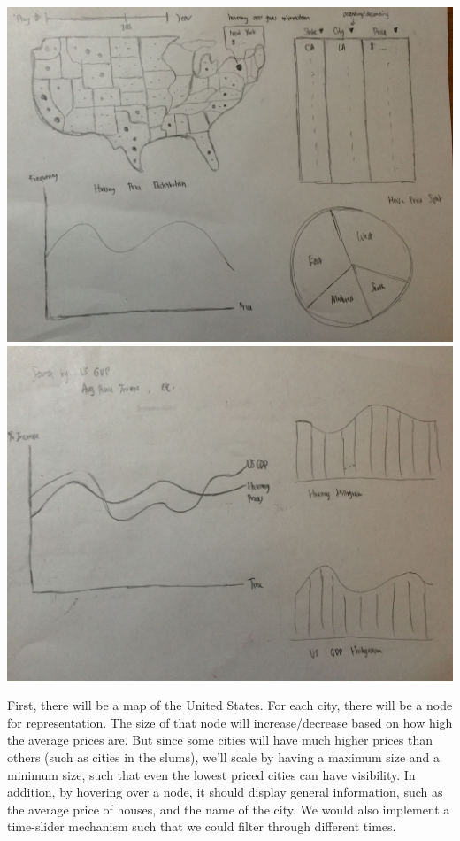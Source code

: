 \documentclass[12pt]{article}
\begin{document}
\begin{center}
\includegraphics[scale=0.13]{pic1.jpg}
\includegraphics[scale=0.13]{pic2.jpg}
\end{center}

First, there will be a map of the United States. For each city, there will be a node for representation. The size of that node will increase/decrease based on how high the average prices are. But since some cities will have much higher prices than others (such as cities in the slums), we'll scale by having a maximum size and a minimum size, such that even the lowest priced cities can have visibility. In addition, by hovering over a node, it should display general information, such as the average price of houses, and the name of the city. We would also implement a time-slider mechanism such that we could filter through different times.
\end{document}
